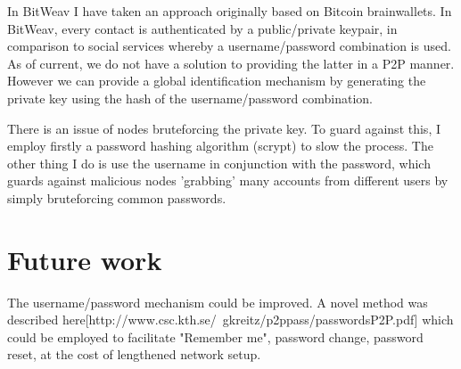 \documentclass[10pt,a4paper,onecolumn]{article}
\begin{document}
In BitWeav I have taken an approach originally based on Bitcoin brainwallets. In BitWeav, every contact is authenticated by a public/private keypair, in comparison to social services whereby a username/password combination is used. As of current, we do not have a solution to providing the latter in a P2P manner. However we can provide a global identification mechanism by generating the private key using the hash of the username/password combination. 

There is an issue of nodes bruteforcing the private key. To guard against this, I employ firstly a password hashing algorithm (scrypt) to slow the process. The other thing I do is use the username in conjunction with the password, which guards against malicious nodes 'grabbing' many accounts from different users by simply bruteforcing common passwords. 


\section{Future work}
The username/password mechanism could be improved. A novel method was described here[http://www.csc.kth.se/~gkreitz/p2ppass/passwordsP2P.pdf] which could be employed to facilitate "Remember me", password change, password reset, at the cost of lengthened network setup. 
\end{document}
